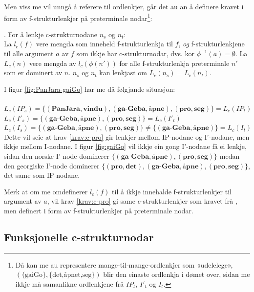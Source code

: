 \documentclass[12pt,a4paper,oneside,draft]{report}
\begin{document}
Men viss me vil unngå å referere til ordlenkjer, går det au an å
definere kravet i form av f-strukturlenkjer på preterminale
nodar\footnote{Då kan me au representere mange-til-mange-ordlenkjer som
        «udelelege», $(\{\text{gaiGo}\},\{\text{det,åpnet,seg}\})$
        blir den einaste ordlenkja i dømet over, sidan me ikkje må
        samanlikne ordlenkjene frå $IP_t$, $I'_t$ og $I_t$. }:

\ex. \label{krav:c-pro} For å lenkje c-strukturnodane $n_s$ og
     $n_t$:\\
     La $l_c(f)$ vere mengda som inneheld
     f-strukturlenkja til $f$, \emph{og} f-strukturlenkjene til alle
     argument $a$ av $f$ som ikkje har c-strukturnodar, dvs. kor
     $\phi^{-1}(a)=\emptyset$.
     La $L_c(n)$ vere mengda av $l_c(\phi(n'))$ for alle
     f-strukturlenkja preterminale $n'$ som er dominert av $n$.
     $n_s$ og $n_t$ kan lenkjast om $L_c(n_s)=L_c(n_t)$.

I figur \ref{fig:PanJara-gaiGo} har me då følgjande situasjon:\\
\\$L_c(IP_s)=\{(\textbf{PanJara},\textbf{vindu}),(\textbf{ga-Geba},\textbf{åpne}),(\textbf{pro},\textbf{seg})\}=L_c(IP_t)$
\\$L_c(I'_s)=\{(\textbf{ga-Geba},\textbf{åpne}),(\textbf{pro},\textbf{seg})\}=L_c(I'_t)$
\\$L_c(I_s)=\{(\textbf{ga-Geba},\textbf{åpne}),(\textbf{pro},\textbf{seg})\}
\neq \{(\textbf{ga-Geba},\textbf{åpne})\}=L_c(I_t)$\\

Dette vil seie at krav \ref{krav:c-pro} gir lenkjer mellom
IP-nodane og I'-nodane, men ikkje mellom I-nodane. I figur
\ref{fig:gaiGo} vil ikkje ein gong I'-nodane få ei lenkje, sidan den
norske I'-node dominerer 
$\{(\textbf{ga-Geba},\textbf{åpne}),(\textbf{pro},\textbf{seg})\}$
medan den georgiske I'-node dominerer
$\{(\textbf{pro},\textbf{det}),(\textbf{ga-Geba},\textbf{åpne}),(\textbf{pro},\textbf{seg})\}$,
det same som IP-nodane.

Merk at om me omdefinerer $l_c(f)$ til å ikkje innehalde
f-strukturlenkjer til argument av $a$, vil krav \ref{krav:c-pro} gi
same c-strukturlenkjer som kravet frå \cite{dyvik2009lmp}, men
definert i form av f-strukturlenkjer på preterminale nodar.
\subsection{Funksjonelle c-strukturnodar}
\label{sec-3.7.3}
\end{document}
